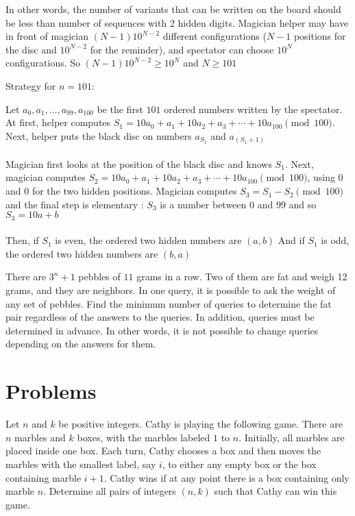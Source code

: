 In other words, the number of variants that can be written on the board should be less than number of sequences with 2 hidden digits. Magician helper may have in front of magician $(N-1)10^{N-2}$ different configurations ($N-1$ positions for the disc and $10^{N-2}$ for the reminder), and spectator can choose $10^{N}$ configurations. So $(N-1)10^{N-2}\geq 10^{N}$ and $N\geq 101$

Strategy for $n=101$:

Let $a_{0},a_{1}, \dots,a_{99},a_{100}$ be the first $101$ ordered numbers written by the spectator. At first, helper computes $S_{1}=10a_{0}+a_{1}+10a_{2}+a_{3}+\cdots+10a_{100}\pmod{100}$. Next, helper puts the black disc on numbers $a_{S_{1}}$ and $a_{(S_{1}+1)}$
\\\\
Magician first looks at the position of the black disc and knows $S_{1}$. Next, magician computes $S_{2}=10a_{0}+a_{1}+10a_{2}+a_{3}+\cdots+10a_{100}\pmod{100}$, using $0$ and $0$ for the two hidden positions. Magician computes $S_{3}=S_{1}-S_{2}\pmod{100}$ and the final step is elementary :
$S_{3}$ is a number between $0$ and $99$ and so $S_{3}=10a+b$
\\\\
Then, if $S_{1}$ is even, the ordered two hidden numbers are $(a,b)$
And if $S_{1}$ is odd, the ordered two hidden numbers are $(b,a)$

\begin{example} [IMSC 2025]

There are $3^n+1$ pebbles of $11$ grams in a row. Two of them are fat and weigh 12 grams, and they are neighbors. In one query, it is possible to ask the weight of any set of pebbles. Find the minimum number of queries to determine the fat pair regardless of the answers to the queries. In addition, queries must be determined in advance. In other words, it is not possible to change queries depending on the answers for them. 
\end{example}
\sol

\newpage

\section{Problems}

\begin{problem} [APMO 2022]
    Let $n$ and $k$ be positive integers. Cathy is playing the following game. There are $n$ marbles and $k$ boxes, with the marbles labeled $1$ to $n$. Initially, all marbles are placed inside one box. Each turn, Cathy chooses a box and then moves the marbles with the smallest label, say $i$, to either any empty box or the box containing marble $i + 1$. Cathy wins if at any point there is a box containing only marble $n$. Determine all pairs of integers $(n, k)$ such that Cathy can win this game.
\end{problem}

